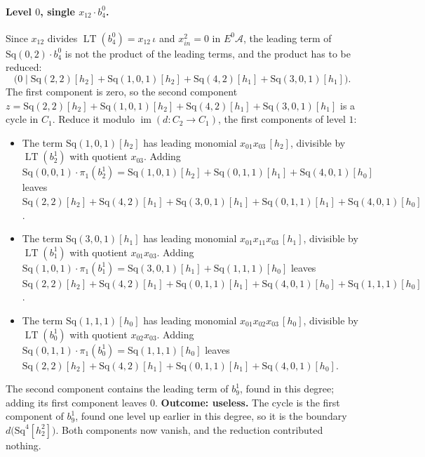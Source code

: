 \documentclass[11pt]{article}
\newcommand{\Sq}{\mathrm{Sq}}
\newcommand{\A}{\mathcal{A}}
\DeclareMathOperator{\LT}{LT}
\begin{document}
\paragraph{Level $0$, single $x_{12}\cdot b^{0}_{4}$.} Since $x_{12}$ divides $\LT(b^{0}_{4}) = x_{12}\,\iota$ and $x_{in}^2 = 0$ in $E^0\A$, the leading term of $\Sq(0,2)\cdot b^{0}_{4}$ is not the product of the leading terms, and the product has to be reduced:
\[\bigl(0 \;\big|\; \Sq(2,2)[h_2] + \Sq(1,0,1)[h_2] + \Sq(4,2)[h_1] + \Sq(3,0,1)[h_1]\bigr).\]
The first component is zero, so the second component $z = \Sq(2,2)[h_2] + \Sq(1,0,1)[h_2] + \Sq(4,2)[h_1] + \Sq(3,0,1)[h_1]$ is a cycle in $C_{1}$.
Reduce it modulo $\operatorname{im}(d\colon C_{2}\to C_{1})$, the first components of level $1$:
\begin{itemize}
\item The term $\Sq(1,0,1)[h_2]$ has leading monomial $x_{01}x_{03}\,[h_2]$, divisible by $\LT(b^{1}_{2})$ with quotient $x_{03}$. Adding $\Sq(0,0,1)\cdot \pi_1(b^{1}_{2}) = \Sq(1,0,1)[h_2] + \Sq(0,1,1)[h_1] + \Sq(4,0,1)[h_0]$ leaves $\Sq(2,2)[h_2] + \Sq(4,2)[h_1] + \Sq(3,0,1)[h_1] + \Sq(0,1,1)[h_1] + \Sq(4,0,1)[h_0]$.
\item The term $\Sq(3,0,1)[h_1]$ has leading monomial $x_{01}x_{11}x_{03}\,[h_1]$, divisible by $\LT(b^{1}_{1})$ with quotient $x_{01}x_{03}$. Adding $\Sq(1,0,1)\cdot \pi_1(b^{1}_{1}) = \Sq(3,0,1)[h_1] + \Sq(1,1,1)[h_0]$ leaves $\Sq(2,2)[h_2] + \Sq(4,2)[h_1] + \Sq(0,1,1)[h_1] + \Sq(4,0,1)[h_0] + \Sq(1,1,1)[h_0]$.
\item The term $\Sq(1,1,1)[h_0]$ has leading monomial $x_{01}x_{02}x_{03}\,[h_0]$, divisible by $\LT(b^{1}_{0})$ with quotient $x_{02}x_{03}$. Adding $\Sq(0,1,1)\cdot \pi_1(b^{1}_{0}) = \Sq(1,1,1)[h_0]$ leaves $\Sq(2,2)[h_2] + \Sq(4,2)[h_1] + \Sq(0,1,1)[h_1] + \Sq(4,0,1)[h_0]$.
\end{itemize}
The second component contains the leading term of $b^{1}_{9}$, found in this degree; adding its first component leaves $0$.
\textbf{Outcome: useless.} The cycle is the first component of $b^{1}_{9}$, found one level up earlier in this degree, so it is the boundary $d\bigl(\Sq^{4}[h_2^2]\bigr)$. Both components now vanish, and the reduction contributed nothing.
\medskip
\end{document}
